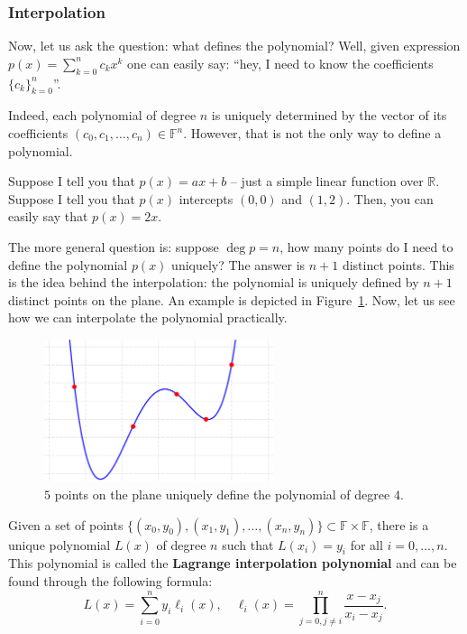 \documentclass[../lecture-notes.tex]{subfiles}
\begin{document}
\subsubsection{Interpolation}

Now, let us ask the question: what defines the polynomial? Well, given expression $p(x) = \sum_{k=0}^n c_kx^k$ one can easily say: ``hey, I need to know the coefficients $\{c_k\}_{k=0}^n$''.

Indeed, each polynomial of degree $n$ is uniquely determined by the vector of its coefficients $(c_0,c_1,\dots,c_n) \in \mathbb{F}^n$. However, that is not the only way to define a polynomial.

Suppose I tell you that $p(x) = ax + b$ -- just a simple linear function over $\mathbb{R}$. Suppose I tell you that $p(x)$ intercepts $(0,0)$ and $(1,2)$. Then, you can easily say that $p(x) = 2x$. 

The more general question is: suppose $\deg p = n$, how many points do I need to define the polynomial $p(x)$ uniquely? The answer is $n+1$ distinct points. This is the idea behind the interpolation:
the polynomial is uniquely defined by $n+1$ distinct points on the plane. An example is depicted 
in Figure~\ref{fig:interpolation}. Now, let us see how we can interpolate the polynomial practically.

\begin{figure}[H]
    \centering
    \includegraphics[width=0.6\textwidth]{images/lecture_1/interpolation.pdf}
    \caption{$5$ points on the plane uniquely define the polynomial of degree $4$.}
    \label{fig:interpolation}
\end{figure}

\begin{theorem}
    Given a set of points $\{(x_0,y_0),(x_1,y_1),\dots,(x_n,y_n)\} \subset \mathbb{F} \times \mathbb{F}$, there is a unique polynomial $L(x)$ of degree $n$ such that $L(x_i) = y_i$ for all $i=0,\dots,n$. This polynomial is called the \textbf{Lagrange interpolation polynomial} and can be 
    found through the following formula:
    \begin{equation}
        L(x) = \sum_{i=0}^{n} y_i \ell_i(x), \quad \ell_i(x) = \prod_{j=0, j \neq i}^{n} \frac{x-x_j}{x_i-x_j}.
    \end{equation}  
\end{theorem}
\end{document}
